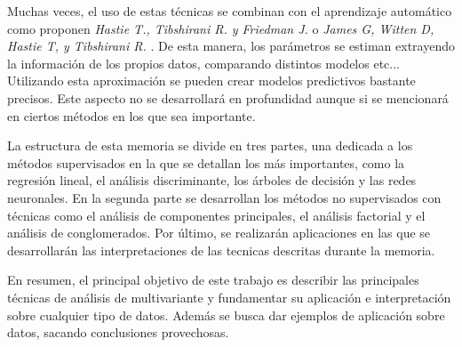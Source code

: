 \noindent Muchas veces, el uso de estas técnicas se combinan con el aprendizaje automático como proponen \textit{Hastie T., Tibshirani R. y Friedman J.} \cite{Hastie 2001} o  \emph{James G, Witten D, Hastie T, y  Tibshirani R.} \cite{James 2013}. De esta manera, los parámetros se estiman extrayendo la información de los propios datos, comparando distintos modelos etc... Utilizando esta aproximación se pueden crear modelos predictivos bastante precisos. Este aspecto no se desarrollará en profundidad aunque si se mencionará en ciertos métodos en los que sea importante. 

\noindent La estructura de esta memoria se divide en tres partes, una dedicada a los métodos supervisados en la que se detallan los más importantes, como la regresión lineal, el análisis discriminante, los árboles de decisión  y las redes neuronales. En la segunda parte se desarrollan los métodos no supervisados con técnicas como el análisis de componentes principales, el análisis factorial y el análisis de conglomerados. Por último, se realizarán aplicaciones en las que se desarrollarán las interpretaciones de las tecnicas descritas durante la memoria. 

\noindent En resumen, el principal objetivo de este trabajo es describir las principales técnicas de análisis de multivariante y fundamentar su aplicación e interpretación sobre cualquier tipo de datos. Además se busca dar ejemplos de aplicación sobre datos, sacando conclusiones provechosas.



